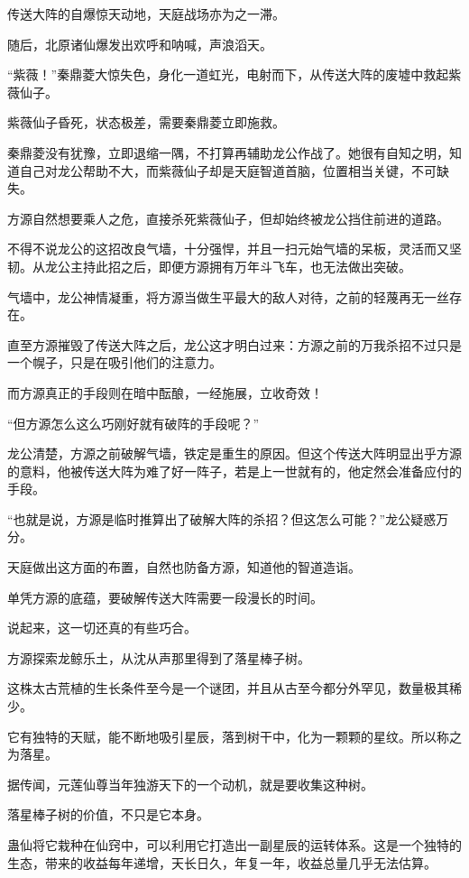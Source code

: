 
\begin{this_body}

传送大阵的自爆惊天动地，天庭战场亦为之一滞。

随后，北原诸仙爆发出欢呼和呐喊，声浪滔天。

“紫薇！”秦鼎菱大惊失色，身化一道虹光，电射而下，从传送大阵的废墟中救起紫薇仙子。

紫薇仙子昏死，状态极差，需要秦鼎菱立即施救。

秦鼎菱没有犹豫，立即退缩一隅，不打算再辅助龙公作战了。她很有自知之明，知道自己对龙公帮助不大，而紫薇仙子却是天庭智道首脑，位置相当关键，不可缺失。

方源自然想要乘人之危，直接杀死紫薇仙子，但却始终被龙公挡住前进的道路。

不得不说龙公的这招改良气墙，十分强悍，并且一扫元始气墙的呆板，灵活而又坚韧。从龙公主持此招之后，即便方源拥有万年斗飞车，也无法做出突破。

气墙中，龙公神情凝重，将方源当做生平最大的敌人对待，之前的轻蔑再无一丝存在。

直至方源摧毁了传送大阵之后，龙公这才明白过来：方源之前的万我杀招不过只是一个幌子，只是在吸引他们的注意力。

而方源真正的手段则在暗中酝酿，一经施展，立收奇效！

“但方源怎么这么巧刚好就有破阵的手段呢？”

龙公清楚，方源之前破解气墙，铁定是重生的原因。但这个传送大阵明显出乎方源的意料，他被传送大阵为难了好一阵子，若是上一世就有的，他定然会准备应付的手段。

“也就是说，方源是临时推算出了破解大阵的杀招？但这怎么可能？”龙公疑惑万分。

天庭做出这方面的布置，自然也防备方源，知道他的智道造诣。

单凭方源的底蕴，要破解传送大阵需要一段漫长的时间。

说起来，这一切还真的有些巧合。

方源探索龙鲸乐土，从沈从声那里得到了落星棒子树。

这株太古荒植的生长条件至今是一个谜团，并且从古至今都分外罕见，数量极其稀少。

它有独特的天赋，能不断地吸引星辰，落到树干中，化为一颗颗的星纹。所以称之为落星。

据传闻，元莲仙尊当年独游天下的一个动机，就是要收集这种树。

落星棒子树的价值，不只是它本身。

蛊仙将它栽种在仙窍中，可以利用它打造出一副星辰的运转体系。这是一个独特的生态，带来的收益每年递增，天长日久，年复一年，收益总量几乎无法估算。


\end{this_body}
